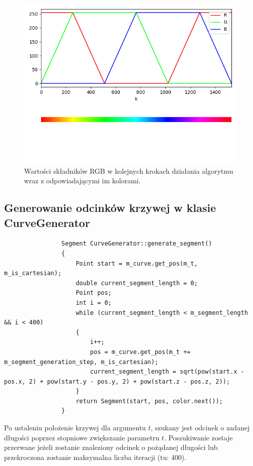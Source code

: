 			\begin{figure}[h!]
				\centering
				\includegraphics[width = \textwidth]{img/colors}
				\caption{Wartości składników RGB w kolejnych krokach działania algorytmu wraz z odpowiadającymi im kolorami.}
			\end{figure}
		\subsection{Generowanie odcinków krzywej w klasie CurveGenerator}
			\begin{lstlisting}
				Segment CurveGenerator::generate_segment()
				{
					Point start = m_curve.get_pos(m_t, m_is_cartesian);
					double current_segment_length = 0;
					Point pos;
					int i = 0;
					while (current_segment_length < m_segment_length && i < 400)
					{
						i++;
						pos = m_curve.get_pos(m_t += m_segment_generation_step, m_is_cartesian);
						current_segment_length = sqrt(pow(start.x - pos.x, 2) + pow(start.y - pos.y, 2) + pow(start.z - pos.z, 2));
					}
					return Segment(start, pos, color.next());
				}
			\end{lstlisting}
			Po ustaleniu położenie krzywej dla argumentu $t$, szukany jest odcinek o zadanej długości poprzez stopniowe zwiększanie parametru $t$.
			Poszukiwanie zostaje przerwane jeżeli zostanie znaleziony odcinek o pożądanej długości lub przekroczona zostanie maksymalna liczba iteracji (tu: 400).
